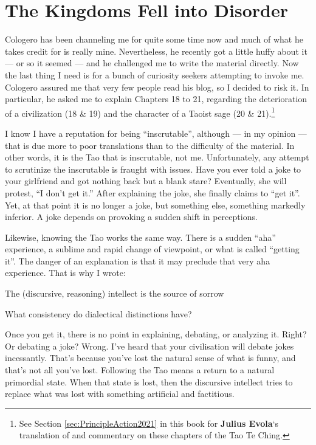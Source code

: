 \section{The Kingdoms Fell into Disorder}

Cologero has been channeling me for quite some time now and much of what he takes credit for is really mine. Nevertheless, he recently got a little huffy about it --- or so it seemed --- and he challenged me to write the material directly. Now the last thing I need is for a bunch of curiosity seekers attempting to invoke me. Cologero assured me that very few people read his blog, so I decided to risk it. In particular, he asked me to explain Chapters 18 to 21, regarding the deterioration of a civilization (18 \& 19) and the character of a Taoist sage (20 \& 21).\footnote{See Section \ref{sec:PrincipleAction2021} in this book for \textbf{Julius Evola}`s translation of and commentary on these chapters of the Tao Te Ching.} 

I know I have a reputation for being ``inscrutable'', although --- in my opinion --- that is due more to poor translations than to the difficulty of the material. In other words, it is the Tao that is inscrutable, not me. Unfortunately, any attempt to scrutinize the inscrutable is fraught with issues. Have you ever told a joke to your girlfriend and got nothing back but a blank stare? Eventually, she will protest, ``I don't get it.'' After explaining the joke, she finally claims to ``get it''. Yet, at that point it is no longer a joke, but something else, something markedly inferior. A joke depends on provoking a sudden shift in perceptions.

Likewise, knowing the Tao works the same way. There is a sudden ``aha'' experience, a sublime and rapid change of viewpoint, or what is called ``getting it''. The danger of an explanation is that it may preclude that very aha experience. That is why I wrote:

\begin{quotex}
The (discursive, reasoning) intellect is the source of sorrow

What consistency do dialectical distinctions have?
\end{quotex}


Once you get it, there is no point in explaining, debating, or analyzing it. Right? Or debating a joke? Wrong. I've heard that your civilisation will debate jokes incessantly. That's because you've lost the natural sense of what is funny, and that's not all you've lost. Following the Tao means a return to a natural primordial state. When that state is lost, then the discursive intellect tries to replace what was lost with something artificial and factitious.

